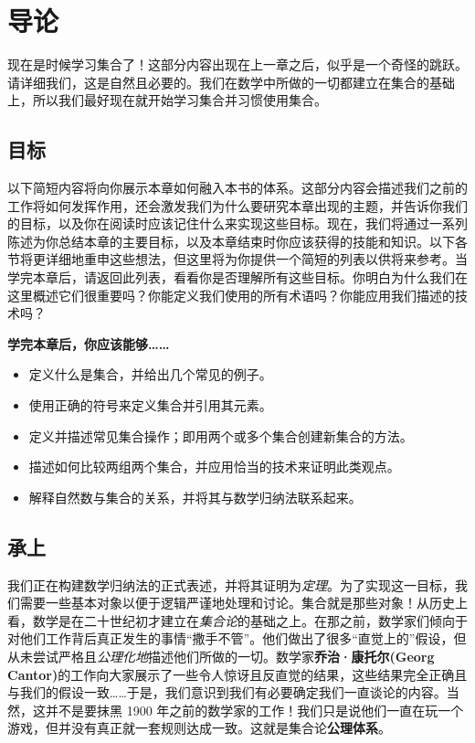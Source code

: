 \section{导论}

现在是时候学习集合了！这部分内容出现在上一章之后，似乎是一个奇怪的跳跃。请详细我们，这是自然且必要的。我们在数学中所做的一切都建立在集合的基础上，所以我们最好现在就开始学习集合并习惯使用集合。

\subsection{目标}

以下简短内容将向你展示本章如何融入本书的体系。这部分内容会描述我们之前的工作将如何发挥作用，还会激发我们为什么要研究本章出现的主题，并告诉你我们的目标，以及你在阅读时应该记住什么来实现这些目标。现在，我们将通过一系列陈述为你总结本章的主要目标，以及本章结束时你应该获得的技能和知识。以下各节将更详细地重申这些想法，但这里将为你提供一个简短的列表以供将来参考。当学完本章后，请返回此列表，看看你是否理解所有这些目标。你明白为什么我们在这里概述它们很重要吗？你能定义我们使用的所有术语吗？你能应用我们描述的技术吗？

\textbf{学完本章后，你应该能够……}

\begin{itemize}
    \item 定义什么是集合，并给出几个常见的例子。
    \item 使用正确的符号来定义集合并引用其元素。
    \item 定义并描述常见集合操作；即用两个或多个集合创建新集合的方法。
    \item 描述如何比较两组两个集合，并应用恰当的技术来证明此类观点。
    \item 解释自然数与集合的关系，并将其与数学归纳法联系起来。
\end{itemize}

\subsection{承上}

我们正在构建数学归纳法的正式表述，并将其证明为\emph{定理}。为了实现这一目标，我们需要一些基本对象以便于逻辑严谨地处理和讨论。集合就是那些对象！从历史上看，数学是在二十世纪初才建立在\emph{集合论}的基础之上。在那之前，数学家们倾向于对他们工作背后真正发生的事情``撒手不管''。他们做出了很多``直觉上的''假设，但从未尝试严格且\emph{公理化地}描述他们所做的一切。数学家\textbf{乔治·康托尔(Georg Cantor)}的工作向大家展示了一些令人惊讶且反直觉的结果，这些结果完全正确且与我们的假设一致……于是，我们意识到我们有必要确定我们一直谈论的内容。当然，这并不是要抹黑 1900 年之前的数学家的工作！我们只是说他们一直在玩一个游戏，但并没有真正就一套规则达成一致。这就是集合论\textbf{公理体系}。

